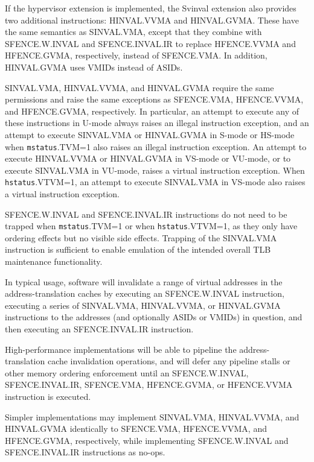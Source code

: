 If the hypervisor extension is implemented, the Svinval extension also provides two
additional instructions: HINVAL.VVMA and HINVAL.GVMA.  These have the same
semantics as SINVAL.VMA, except that they combine with SFENCE.W.INVAL and
SFENCE.INVAL.IR to replace HFENCE.VVMA and HFENCE.GVMA, respectively, instead
of SFENCE.VMA.  In addition, HINVAL.GVMA uses VMIDs instead of ASIDs.

SINVAL.VMA, HINVAL.VVMA, and HINVAL.GVMA require the same permissions and raise
the same exceptions as SFENCE.VMA, HFENCE.VVMA, and HFENCE.GVMA, respectively.
In particular, an attempt to execute any of these instructions in
U-mode always raises an illegal instruction exception, and an attempt
to execute SINVAL.VMA or HINVAL.GVMA in S-mode or HS-mode when
{\tt mstatus}.TVM=1 also raises an illegal instruction exception.
An attempt to execute HINVAL.VVMA or HINVAL.GVMA in VS-mode or VU-mode,
or to execute SINVAL.VMA in VU-mode, raises a virtual instruction
exception.
When {\tt hstatus}.VTVM=1, an attempt to execute SINVAL.VMA in VS-mode
also raises a virtual instruction exception.

\begin{commentary}
  SFENCE.W.INVAL and SFENCE.INVAL.IR instructions do not need to be trapped when
  {\tt mstatus}.TVM=1 or when {\tt hstatus}.VTVM=1, as they only have ordering
  effects but no visible side effects.  Trapping of the SINVAL.VMA instruction
  is sufficient to enable emulation of the intended overall TLB maintenance
  functionality.

  In typical usage, software will invalidate a range of virtual addresses in
  the address-translation caches by executing an SFENCE.W.INVAL instruction,
  executing a series of SINVAL.VMA, HINVAL.VVMA, or HINVAL.GVMA instructions to
  the addresses (and optionally ASIDs or VMIDs) in question, and then executing
  an SFENCE.INVAL.IR instruction.

  High-performance implementations will be able to pipeline the
  address-translation cache invalidation operations, and will defer any
  pipeline stalls or other memory ordering enforcement until an SFENCE.W.INVAL,
  SFENCE.INVAL.IR, SFENCE.VMA, HFENCE.GVMA, or HFENCE.VVMA instruction is
  executed.

  Simpler implementations may implement SINVAL.VMA, HINVAL.VVMA, and
  HINVAL.GVMA identically to SFENCE.VMA, HFENCE.VVMA, and HFENCE.GVMA,
  respectively, while implementing SFENCE.W.INVAL and SFENCE.INVAL.IR
  instructions as no-ops.
\end{commentary}
